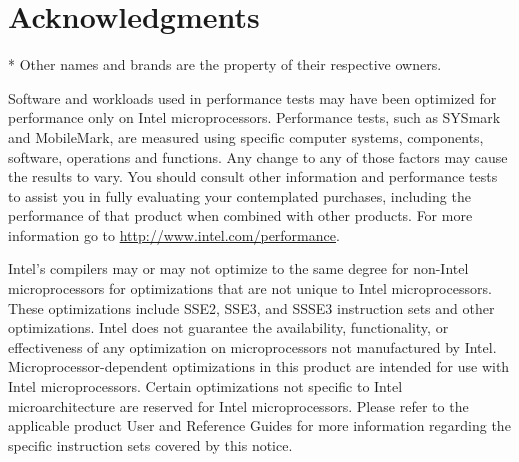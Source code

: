 \section*{Acknowledgments}


* Other names and brands are the property of their respective owners.

Software and workloads used in performance tests may have been
optimized for performance only on Intel microprocessors.  Performance
tests, such as SYSmark and MobileMark, are measured using specific
computer systems, components, software, operations and functions.  Any
change to any of those factors may cause the results to vary.  You
should consult other information and performance tests to assist you
in fully evaluating your contemplated purchases, including the
performance of that product when combined with other products.  For
more information go to \url{http://www.intel.com/performance}.

Intel's compilers may or may not optimize to the same degree for
non-Intel microprocessors for optimizations that are not unique to
Intel microprocessors. These optimizations include SSE2, SSE3, and
SSSE3 instruction sets and other optimizations. Intel does not
guarantee the availability, functionality, or effectiveness of any
optimization on microprocessors not manufactured by
Intel. Microprocessor-dependent optimizations in this product are
intended for use with Intel microprocessors. Certain optimizations not
specific to Intel microarchitecture are reserved for Intel
microprocessors. Please refer to the applicable product User and
Reference Guides for more information regarding the specific
instruction sets covered by this notice.